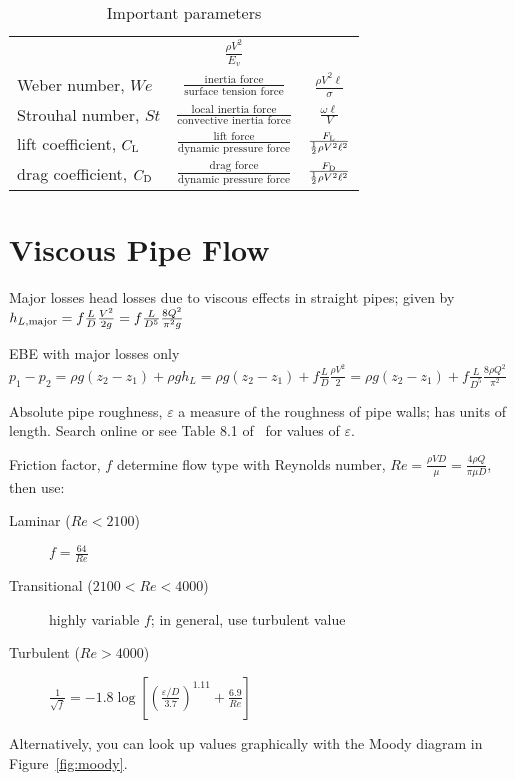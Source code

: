 \documentclass{article}
\begin{document}
\begin{table}
{\begin{tabu}{lcc}
  & \(\frac{\rho{}V^2}{E_v}\) \\
  Weber number, \(\mathit{We}\) & \(\frac{\textrm{inertia force}}{\textrm{surface tension force}}\)
  & \(\frac{\rho{}V^2\ell}{\sigma}\) \\
  Strouhal number, \(\mathit{St}\)
  & \(\frac{\textrm{local inertia force}}{\textrm{convective inertia force}}\)
  & \(\frac{\omega\ell}{V}\) \\
  lift coefficient, \(C_{\mathrm{L}}\) & \(\frac{\textrm{lift force}}{\textrm{dynamic pressure force}}\)
  & \(\frac{F_{\mathrm{L}}}{\frac12\rho{}V^2\ell^2}\) \\
  drag coefficient, \(C_{\mathrm{D}}\) & \(\frac{\textrm{drag force}}{\textrm{dynamic pressure force}}\)
  & \(\frac{F_{\mathrm{D}}}{\frac12\rho{}V^2\ell^2}\) \\
  \bottomrule
  \end{tabu}}
  \caption{Important parameters}\label{tab:params}
\end{table}

\section{Viscous Pipe Flow}

\begin{description*}
\item[Major losses] head losses due to viscous effects in straight pipes; given by
  \(h_{L,\mathrm{major}} = f\frac{L}{D}\frac{V^2}{2g} = f\frac{L}{D^5}\frac{8Q^2}{\pi^2g}\)
\item[EBE with major losses only]
  \(p_1-p_2 = \rho{}g(z_2-z_1)+\rho{}gh_L = \rho{}g(z_2-z_1) + f\frac{L}{D}\frac{\rho{}V^2}{2}
  = \rho{}g(z_2-z_1) + f\frac{L}{D^5}\frac{8\rho{}Q^2}{\pi^2}\)
\item[Absolute pipe roughness, $\varepsilon$] a measure of the roughness of pipe walls; has units of
  length. Search online or see Table 8.1 of~\cite{fofm} for values of $\varepsilon$.
\item[Friction factor, $f$] determine flow type with Reynolds number,
  \(\mathit{Re} = \frac{\rho{}VD}{\mu} = \frac{4\rho{}Q}{\pi\mu{}D}\), then use:
  \begin{description}
  \item[Laminar (\(\mathit{Re}<2100\))]
    \(f = \frac{64}{\mathit{Re}}\)
  \item[Transitional (\(2100<\mathit{Re}<4000\))]
    highly variable $f$; in general, use turbulent value
  \item[Turbulent (\(\mathit{Re}>4000\))]
    \(\frac{1}{\sqrt{f}}
    = -1.8\log\left[{\left(\frac{\varepsilon/D}{3.7}\right)}^{1.11}
      + \frac{6.9}{\mathit{Re}}\right]\)
  \end{description}
  Alternatively, you can look up values graphically with the Moody diagram in Figure~\ref{fig:moody}.
\end{description*}
\end{document}
